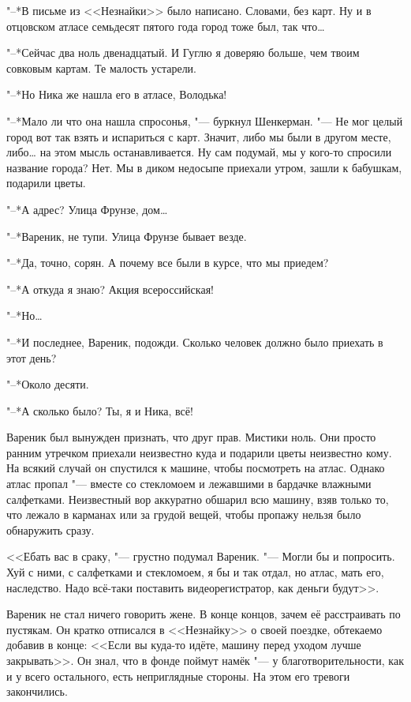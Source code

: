 "--*В письме из <<Незнайки>> было написано.
Словами, без карт.
Ну и в отцовском атласе семьдесят пятого года город тоже был, так что\ldots{}

"--*Сейчас два ноль двенадцатый.
И Гуглю я доверяю больше, чем твоим совковым картам.
Те малость устарели.

"--*Но Ника же нашла его в атласе, Володька!

"--*Мало ли что она нашла спросонья, "--- буркнул Шенкерман.
"--- Не мог целый город вот так взять и испариться с карт.
Значит, либо мы были в другом месте, либо\ldots{} на этом мысль останавливается.
Ну сам подумай, мы у кого-то спросили название города?
Нет.
Мы в диком недосыпе приехали утром, зашли к бабушкам, подарили цветы.

"--*А адрес?
Улица Фрунзе, дом\ldots{}

"--*Вареник, не тупи.
Улица Фрунзе бывает везде.

"--*Да, точно, сорян.
А почему все были в курсе, что мы приедем?

"--*А откуда я знаю?
Акция всероссийская!

"--*Но\ldots{}

"--*И последнее, Вареник, подожди.
Сколько человек должно было приехать в этот день?

"--*Около десяти.

"--*А сколько было?
Ты, я и Ника, всё!

Вареник был вынужден признать, что друг прав.
Мистики ноль.
Они просто ранним утречком приехали неизвестно куда и подарили цветы неизвестно кому.
На всякий случай он спустился к машине, чтобы посмотреть на атлас.
Однако атлас пропал "--- вместе со стекломоем и лежавшими в бардачке влажными салфетками.
Неизвестный вор аккуратно обшарил всю машину, взяв только то, что лежало в карманах или за грудой вещей, чтобы пропажу нельзя было обнаружить сразу.

<<Ебать вас в сраку, "--- грустно подумал Вареник.
"--- Могли бы и попросить.
Хуй с ними, с салфетками и стекломоем, я бы и так отдал, но атлас, мать его, наследство.
Надо всё-таки поставить видеорегистратор, как деньги будут>>.

Вареник не стал ничего говорить жене.
В конце концов, зачем её расстраивать по пустякам.
Он кратко отписался в <<Незнайку>> о своей поездке, обтекаемо добавив в конце:
<<Если вы куда-то идёте, машину перед уходом лучше закрывать>>.
Он знал, что в фонде поймут намёк "--- у благотворительности, как и у всего остального, есть неприглядные стороны.
На этом его тревоги закончились.

